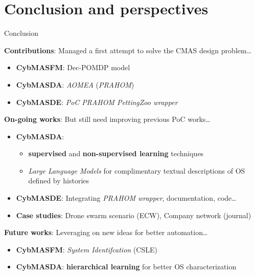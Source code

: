 \section{Conclusion and perspectives}
\begin{frame}{Conclusion}
    {}

    \begin{exampleblock}{\textbf{Contributions}: Managed a first attempt to solve the CMAS design problem\dots}

        \begin{itemize}
            \item \textbf{CybMASFM}: Dec-POMDP model
            \item \textbf{CybMASDA}: \emph{AOMEA} (\emph{PRAHOM})
            \item \textbf{CybMASDE}: \emph{PoC} \emph{PRAHOM PettingZoo wrapper}
        \end{itemize}



    \end{exampleblock}

    \begin{block}{\textbf{On-going works}: But still need improving previous PoC works\dots}

        \begin{itemize}
            \item \textbf{CybMASDA}:
                  \begin{itemize}
                      \item \textbf{supervised} and \textbf{non-supervised learning} techniques
                      \item \emph{Large Language Models} for complimentary textual descriptions of OS defined by histories
                  \end{itemize}
            \item \textbf{CybMASDE}: Integrating \emph{PRAHOM wrapper}, documentation, code\dots
            \item \textbf{Case studies}: Drone swarm scenario (ECW), Company network (journal)
        \end{itemize}

    \end{block}

    \begin{alertblock}{\textbf{Future works}: Leveraging on new ideas for better automation\dots}
        \begin{itemize}
            \item \textbf{CybMASFM}: \emph{System Identifcation} (CSLE)
            \item \textbf{CybMASDA}: \textbf{hierarchical learning} for better OS characterization

        \end{itemize}

    \end{alertblock}



\end{frame}


